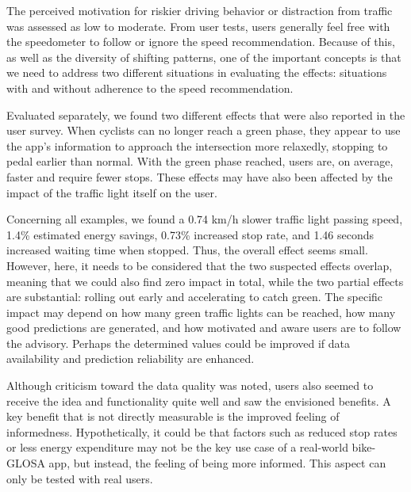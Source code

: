 The perceived motivation for riskier driving behavior or distraction from traffic was assessed as low to moderate. From user tests, users generally feel free with the speedometer to follow or ignore the speed recommendation. Because of this, as well as the diversity of shifting patterns, one of the important concepts is that we need to address two different situations in evaluating the effects: situations with and without adherence to the speed recommendation. 

Evaluated separately, we found two different effects that were also reported in the user survey. When cyclists can no longer reach a green phase, they appear to use the app's information to approach the intersection more relaxedly, stopping to pedal earlier than normal. With the green phase reached, users are, on average, faster and require fewer stops. These effects may have also been affected by the impact of the traffic light itself on the user. 

Concerning all examples, we found a 0.74 km/h slower traffic light passing speed, 1.4\% estimated energy savings, 0.73\% increased stop rate, and 1.46 seconds increased waiting time when stopped. Thus, the overall effect seems small. However, here, it needs to be considered that the two suspected effects overlap, meaning that we could also find zero impact in total, while the two partial effects are substantial: rolling out early and accelerating to catch green. The specific impact may depend on how many green traffic lights can be reached, how many good predictions are generated, and how motivated and aware users are to follow the advisory. Perhaps the determined values could be improved if data availability and prediction reliability are enhanced. 

Although criticism toward the data quality was noted, users also seemed to receive the idea and functionality quite well and saw the envisioned benefits. A key benefit that is not directly measurable is the improved feeling of informedness. Hypothetically, it could be that factors such as reduced stop rates or less energy expenditure may not be the key use case of a real-world bike-GLOSA app, but instead, the feeling of being more informed. This aspect can only be tested with real users.
